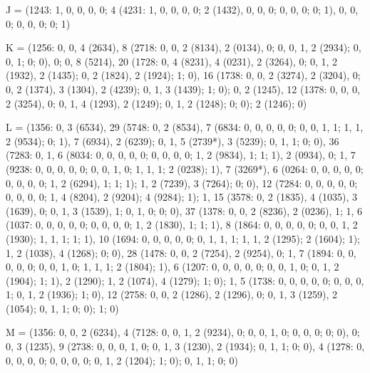 {J = (1243: 1, 0, 0, 0, 0; 4 (4231: 1, 0, 0, 0, 0; 2 (1432), 0, 0, 0; 0, 0, 0; 0; 1), 0, 0, 0; 0, 0, 0; 0; 1)

K = (1256: 0, 0, 4 (2634), 8 (2718: 0, 0, 2 (8134), 2 (0134), 0; 0, 0, 1, 2 (2934); 0, 0, 1; 0; 0), 0; 0, 8 (5214), 20 (1728: 0, 4 (8231), 4 (0231), 2 (3264), 0; 0, 1, 2 (1932), 2 (1435); 0, 2 (1824), 2 (1924); 1; 0), 16 (1738: 0, 0, 2 (3274), 2 (3204), 0; 0, 2 (1374), 3 (1304), 2 (4239); 0, 1, 3 (1439); 1; 0); 0, 2 (1245), 12 (1378: 0, 0, 0, 2 (3254), 0; 0, 1, 4 (1293), 2 (1249); 0, 1, 2 (1248); 0; 0); 2 (1246); 0)

L = (1356: 0, 3 (6534), 29 (5748: 0, 2 (8534), 7 (6834: 0, 0, 0, 0, 0; 0, 0, 1, 1; 1, 1, 2 (9534); 0; 1), 7 (6934), 2 (6239); 0, 1, 5 (2739*), 3 (5239); 0, 1, 1; 0; 0), 36 (7283: 0, 1, 6 (8034: 0, 0, 0, 0, 0; 0, 0, 0, 0; 1, 2 (9834), 1; 1; 1), 2 (0934), 0; 1, 7 (9238: 0, 0, 0, 0, 0; 0, 0, 1, 0; 1, 1, 1; 2 (0238); 1), 7 (3269*), 6 (0264: 0, 0, 0, 0, 0; 0, 0, 0, 0; 1, 2 (6294), 1; 1; 1); 1, 2 (7239), 3 (7264); 0; 0), 12 (7284: 0, 0, 0, 0, 0; 0, 0, 0, 0; 1, 4 (8204), 2 (9204); 4 (9284); 1); 1, 15 (3578: 0, 2 (1835), 4 (1035), 3 (1639), 0; 0, 1, 3 (1539), 1; 0, 1, 0; 0; 0), 37 (1378: 0, 0, 2 (8236), 2 (0236), 1; 1, 6 (1037: 0, 0, 0, 0, 0; 0, 0, 0, 0; 1, 2 (1830), 1; 1; 1), 8 (1864: 0, 0, 0, 0, 0; 0, 0, 1, 2 (1930); 1, 1, 1; 1; 1), 10 (1694: 0, 0, 0, 0, 0; 0, 1, 1, 1; 1, 1, 2 (1295); 2 (1604); 1); 1, 2 (1038), 4 (1268); 0; 0), 28 (1478: 0, 0, 2 (7254), 2 (9254), 0; 1, 7 (1894: 0, 0, 0, 0, 0; 0, 0, 1, 0; 1, 1, 1; 2 (1804); 1), 6 (1207: 0, 0, 0, 0, 0; 0, 0, 1, 0; 0, 1, 2 (1904); 1; 1), 2 (1290); 1, 2 (1074), 4 (1279); 1; 0); 1, 5 (1738: 0, 0, 0, 0, 0; 0, 0, 0, 1; 0, 1, 2 (1936); 1; 0), 12 (2758: 0, 0, 2 (1286), 2 (1296), 0; 0, 1, 3 (1259), 2 (1054); 0, 1, 1; 0; 0); 1; 0)

M = (1356: 0, 0, 2 (6234), 4 (7128: 0, 0, 1, 2 (9234), 0; 0, 0, 1, 0; 0, 0, 0; 0; 0), 0; 0, 3 (1235), 9 (2738: 0, 0, 0, 1, 0; 0, 1, 3 (1230), 2 (1934); 0, 1, 1; 0; 0), 4 (1278: 0, 0, 0, 0, 0; 0, 0, 0, 0; 0, 1, 2 (1204); 1; 0); 0, 1, 1; 0; 0)
}